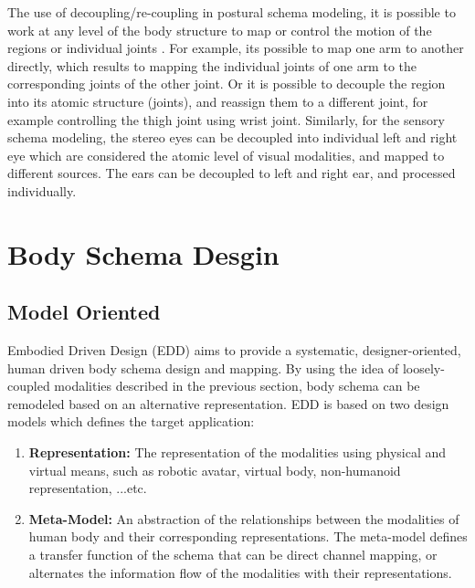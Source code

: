 The use of decoupling/re-coupling in postural schema modeling, it is possible to work at any level of the body structure to map or control the motion of the regions or individual joints . For example, its possible to map one arm to another directly, which results to mapping the individual joints of one arm to the corresponding joints of the other joint. Or it is possible to decouple the region into its atomic structure (joints), and reassign them to a different joint, for example controlling the thigh joint using wrist joint. Similarly, for the sensory schema modeling, the stereo eyes can be decoupled into individual left and right eye which are considered the atomic level of visual modalities, and mapped to different sources. The ears can be decoupled to left and right ear, and processed individually.

\section{Body Schema Desgin}
\label{sec:concept-bodyschema}

\subsection{Model Oriented}

Embodied Driven Design (EDD) aims to provide a systematic, designer-oriented, human driven body schema design and mapping. By using the idea of loosely-coupled modalities described in the previous section, body schema can be remodeled based on an alternative representation. EDD is based on two design models which defines the target application:
\begin{enumerate}
  	\setlength\itemsep{0em}
\item \textbf{Representation:} The representation of the modalities using physical and virtual means, such as robotic avatar, virtual body, non-humanoid representation, ...etc.
\item \textbf{Meta-Model:} An abstraction of the relationships between the modalities of human body and their corresponding representations. The meta-model defines a transfer function of the schema that can be direct channel mapping, or alternates the information flow of the modalities with their representations.
\end{enumerate}


